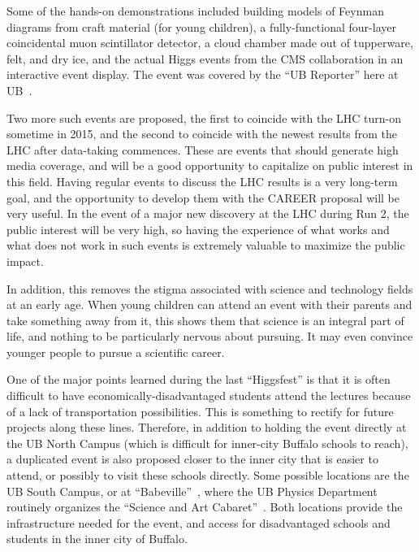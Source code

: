 \documentclass[12pt]{proposalnsf}
\begin{document}
Some of the hands-on demonstrations included building models of
Feynman diagrams from craft material (for young children), a
fully-functional four-layer coincidental muon scintillator detector,
a cloud chamber made out of tupperware, felt, and dry ice, and the
actual Higgs events from the CMS collaboration in an interactive event
display. 
The event was covered by the ``UB Reporter'' here at
UB~\cite{higgsfest_ubreporter}. 

Two more such events are proposed, the first to coincide with the LHC
turn-on sometime in 2015, and the second to coincide with the newest
results from the LHC after data-taking commences. These are 
events that should generate high media coverage, and will be a good
opportunity to capitalize on public interest in this field. Having
regular events to discuss the LHC results is a very long-term goal,
and the opportunity to develop them with the CAREER proposal
will be very useful. In the event of a major new discovery at the LHC
during Run 2, the public interest will be very high, so having the
experience of what works and what does not work in such events is
extremely valuable to maximize the public impact. 

In addition, this removes the stigma associated with science and
technology fields at an early age. When young children can attend an
event with their parents and take something away from it, this shows
them that science is an integral part of life, and nothing to be
particularly nervous about pursuing. It may even convince younger
people to pursue a scientific career. 

One of the major points learned during the last ``Higgsfest''
is that it is often difficult to have economically-disadvantaged
students attend the lectures because of a lack of transportation
possibilities. This is something to rectify for future
projects along these lines. Therefore, in addition to holding the
event directly
at the UB North Campus (which is difficult for inner-city
Buffalo schools to reach), a duplicated event is also proposed
closer to the inner city that is easier to attend, or possibly to
visit these schools directly. Some possible
locations are the UB South Campus, or at
``Babeville''~\cite{babeville}, where the UB Physics
Department routinely organizes the ``Science and Art
Cabaret''~\cite{cabaret}. Both locations 
provide the infrastructure needed for the event, and
access for disadvantaged schools and students in the inner city of
Buffalo. 


\end{document}
